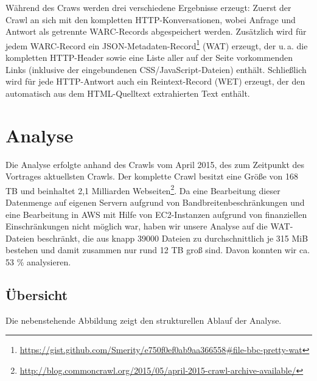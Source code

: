 \documentclass[a4paper,12pt,titlepage=false]{scrreprt}
\begin{document}
Während des Craws werden drei verschiedene Ergebnisse erzeugt: Zuerst der Crawl an sich mit den kompletten HTTP-Konversationen, wobei Anfrage und Antwort als getrennte WARC-Records abgespeichert werden. Zusätzlich wird für jedem WARC-Record ein JSON-Metadaten-Record\footnote{\url{https://gist.github.com/Smerity/e750f0ef0ab9aa366558\#file-bbc-pretty-wat}} (WAT) erzeugt, der u.\,a. die kompletten HTTP-Header sowie eine Liste aller auf der Seite vorkommenden Links (inklusive der eingebundenen CSS/JavaScript-Dateien) enthält. Schließlich wird für jede HTTP-Antwort auch ein Reintext-Record (WET) erzeugt, der den automatisch aus dem HTML-Quelltext extrahierten Text enthält.


\chapter{Analyse}

Die Analyse erfolgte anhand des Crawls vom April 2015, des zum Zeitpunkt des
Vortrages aktuellsten Crawls. Der komplette Crawl besitzt eine Größe von 168 TB und beinhaltet 2,1 Milliarden Webseiten\footnote{\url{http://blog.commoncrawl.org/2015/05/april-2015-crawl-archive-available/}}.
Da eine Bearbeitung dieser Datenmenge auf eigenen Servern aufgrund von
Bandbreitenbeschränkungen und eine Bearbeitung in AWS mit Hilfe von EC2-Instanzen
aufgrund von finanziellen Einschränkungen nicht möglich war, haben wir unsere
Analyse auf die WAT-Dateien beschränkt, die aus knapp 39000 Dateien zu
durchschnittlich je 315 MiB bestehen und damit zusammen nur rund 12 TB groß sind.
Davon konnten wir ca. 53 \% analysieren.

\section{Übersicht}

\begin{figure}
\label{wrap-fig:1}
\end{figure}

Die nebenstehende Abbildung zeigt den strukturellen Ablauf der Analyse.
\end{document}
